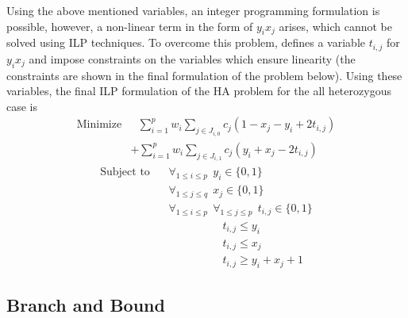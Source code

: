 \documentclass[10pt,a4paer,twocolumn]{article}
\begin{document}
Using the above mentioned variables, an integer programming formulation is possible, however, a non-linear 
term in the form of $y_ix_j$ arises, which cannot be solved using ILP techniques. To overcome this problem, 
\cite{chen:2013} defines a variable $t_{i,j}$ for $y_ix_j$ and impose constraints on the variables which 
ensure linearity (the constraints are shown in the final formulation of the problem below). Using these 
variables, the final ILP formulation of the HA problem for the all heterozygous case is 
\begin{equation*}
\begin{split}
    \textrm{Minimize} 
    &\ \ \ \sum_{i = 1}^{p}{w_i} \sum_{j \in J_{i, 0} }^{}{c_j(1 - x_j - y_i + 2t_{i,j})}                 \\
    &+ \sum_{i = 1}^{p}{w_i} \sum_{j \in J_{i, 1}}^{}{c_j(y_i + x_j - 2t_{i,j})}                
\end{split}
\end{equation*}
\begin{equation*}
\begin{split}
    \textrm{Subject to} 
    &\ \ \ \ \forall_{1 \le i \le p} \ \ y_i \in \{0, 1\}                                                 \\
    &\ \ \ \ \forall_{1 \le j \le q} \ \ x_j \in \{0, 1\}                                                 \\
    &\ \ \ \ \forall_{1 \le i \le p} \ \ \forall_{1 \le j \le p} \ \ t_{i,j} \in \{0, 1\}                 \\
    &\ \ \ \ \ \ \ \ \ \ \ \ \ \ \ \ \ \ \ \ \ \ \ \ \ \ t_{i,j} \le y_i                                  \\ 
    &\ \ \ \ \ \ \ \ \ \ \ \ \ \ \ \ \ \ \ \ \ \ \ \ \ \ t_{i,j} \le x_j                                  \\ 
    &\ \ \ \ \ \ \ \ \ \ \ \ \ \ \ \ \ \ \ \ \ \ \ \ \ \ t_{i,j} \ge y_i + x_j + 1              
    \end{split}
\end{equation*}


\subsection{Branch and Bound} \label{sec:bnb}
\end{document}
